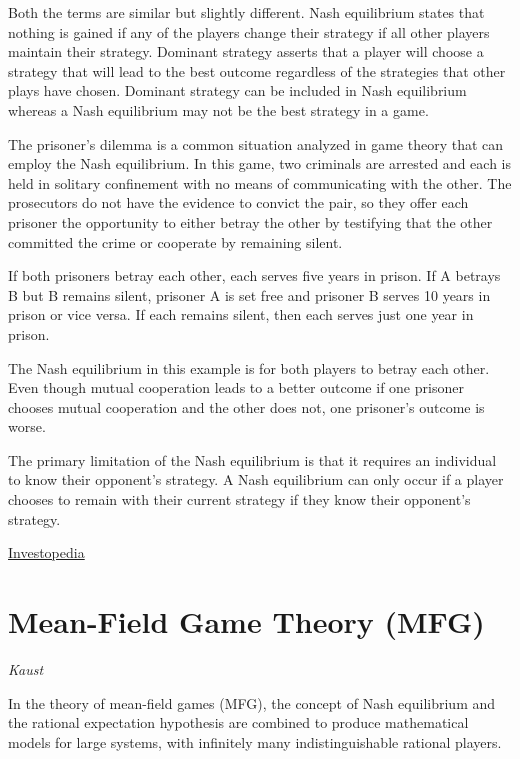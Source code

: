 \documentclass[
]{book}
\begin{document}
Both the terms are similar but slightly different. Nash equilibrium states that nothing is gained if any of the players change their strategy if all other players maintain their strategy. Dominant strategy asserts that a player will choose a strategy that will lead to the best outcome regardless of the strategies that other plays have chosen. Dominant strategy can be included in Nash equilibrium whereas a Nash equilibrium may not be the best strategy in a game.

The prisoner's dilemma is a common situation analyzed in game theory that can employ the Nash equilibrium. In this game, two criminals are arrested and each is held in solitary confinement with no means of communicating with the other. The prosecutors do not have the evidence to convict the pair, so they offer each prisoner the opportunity to either betray the other by testifying that the other committed the crime or cooperate by remaining silent.

If both prisoners betray each other, each serves five years in prison. If A betrays B but B remains silent, prisoner A is set free and prisoner B serves 10 years in prison or vice versa. If each remains silent, then each serves just one year in prison.

The Nash equilibrium in this example is for both players to betray each other. Even though mutual cooperation leads to a better outcome if one prisoner chooses mutual cooperation and the other does not, one prisoner's outcome is worse.

The primary limitation of the Nash equilibrium is that it requires an individual to know their opponent's strategy. A Nash equilibrium can only occur if a player chooses to remain with their current strategy if they know their opponent's strategy.

\href{https://www.investopedia.com/terms/n/nash-equilibrium.asp}{Investopedia}

\hypertarget{mean-field-game-theory-mfg}{%
\section{Mean-Field Game Theory (MFG)}\label{mean-field-game-theory-mfg}}

\emph{Kaust}

In the theory of mean-field games (MFG), the concept of Nash
equilibrium and the rational expectation hypothesis are combined to
produce mathematical models for large systems, with infinitely many
indistinguishable rational players.
\end{document}
